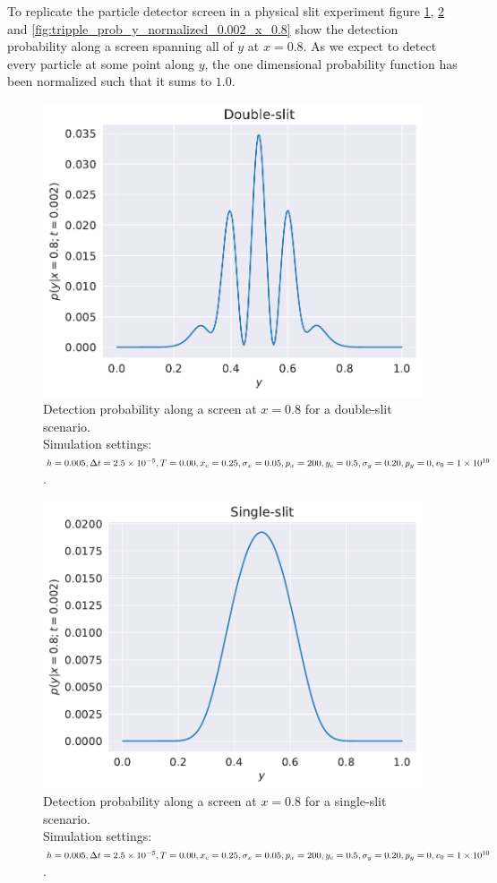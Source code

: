 \documentclass[english,notitlepage,reprint,nofootinbib]{revtex4-1}  %
\begin{document}
To replicate the particle detector screen in a physical slit experiment figure \ref{fig:prob_y_normalized_0.002_x_0.8}, \ref{fig:single_prob_y_normalized_0.002_x_0.8} and \ref{fig:tripple_prob_y_normalized_0.002_x_0.8} show the detection probability along a screen spanning all of $y$ at $x = 0.8$. As we expect to detect every particle at some point along $y$, the one dimensional probability function has been normalized such that it sums to $1.0$.
\begin{figure}[H]
    \centering
    \includegraphics[width=.5\textwidth]{../figures/prob_y_normalized_0.002_x_0.8.pdf}
    \caption{ Detection probability along a screen at $x =0.8$ for a double-slit scenario. \\Simulation settings: $h = 0.005, \Delta t = 2.5 \times 10^{-5}, \\T = 0.00, x_c = 0.25, \sigma_x = 0.05, p_x = 200, y_c = 0.5, \\\sigma_y = 0.20, p_y = 0, v_0 = 1 \times 10^{10}$.}
    \label{fig:prob_y_normalized_0.002_x_0.8}
\end{figure}
\begin{figure}[H]
    \centering
    \includegraphics[width=.5\textwidth]{../figures/single_prob_y_normalized_0.002_x_0.8.pdf}
    \caption{Detection probability along a screen at $x =0.8$ for a single-slit scenario. \\Simulation settings: $h = 0.005, \Delta t = 2.5 \times 10^{-5}, \\T = 0.00, x_c = 0.25, \sigma_x = 0.05, p_x = 200, y_c = 0.5, \\\sigma_y = 0.20, p_y = 0, v_0 = 1 \times 10^{10}$.}
    \label{fig:single_prob_y_normalized_0.002_x_0.8}
\end{figure}
\end{document}
